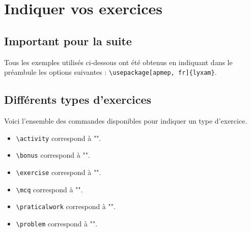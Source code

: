 \documentclass[12pt,a4paper]{article}
\makeatletter
\theoremstyle{definition}
\newcommand\@IDoptarg{\@ifstar{\@IDoptargStar}{\@IDoptargNoStar}}
\newcommand\@IDoptargStar[2]{%
    	\vspace{0.5em}
		--- \texttt{#1%
			\IfStrEq{#2}{}{:}{\,#2:}%
		}%
	}
\newcommand\@IDoptargNoStar[2]{%
    	\IfStrEq{#2}{}{%
			\@IDoptargStar{#1}{}%
		}{%
			\@IDoptargStar{#1}{\##2}%
		}%
	}
\newcommand\IDkey[1]{%
    	\@IDoptarg*{Option}{{\itshape "#1"}}%
	}
\makeatother
\begin{document}
\newcommand\exosoptions{
\IDkey{pts} le nombre de points avec le cas particulier de $0$ qui demande d'afficher "Non noté".

\IDkey{time} la durée de l'exercice.

\IDkey{id} un texte de votre choix pour remplacer le numéro (ceci a pour effet de bloquer temporairement la numérotation).

\IDkey{title} un titre.

\IDkey{note} une petite indication liée à l'exercice (comme par exemple qu'il ne s'adresse qu'aux élèves motivés).

\IDkey{src} la source utilisée pour confectionner l'exercice.
}


\section{Indiquer vos exercices}

    \subsection{Important pour la suite}

Tous les exemples utilisés ci-dessous ont été obtenus en indiquant dans le préambule les options suivantes : \verb+\usepackage[apmep, fr]{lyxam}+.


    \subsection{Différents types d'exercices}

Voici l'ensemble des commandes disponibles pour indiquer un type d'exercice.

\begin{itemize}[label=\textbullet]
\makeatletter
    \item \verb+\activity+ correspond à "\lyxam@text@activity{}".
    
    \item \verb+\bonus+ correspond à "\lyxam@text@bonus{}".
    
    \item \verb+\exercise+ correspond à "\lyxam@text@exercise{}".
    
    \item \verb+\mcq+ correspond à "\lyxam@text@mcq{}".
    
    \item \verb+\praticalwork+ correspond à "\lyxam@text@praticalwork{}".
    
    \item \verb+\problem+ correspond à "\lyxam@text@problem{}".
\makeatother
\end{itemize}
\end{document}
